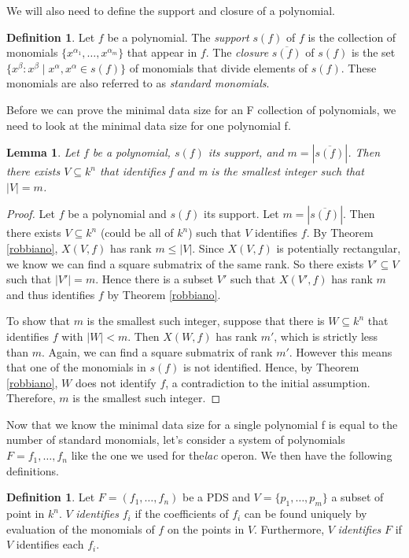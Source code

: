 \documentclass{amsart}
\newtheorem{lem}[thm]{Lemma}
\theoremstyle{definition}
\newtheorem{defn}[thm]{Definition}
\theoremstyle{remark}
\theoremstyle{example}
\theoremstyle{conjecture}
\numberwithin{equation}{section}
\begin{document}
We will also need to define the support and closure of a polynomial.

\begin{defn}
Let $f$ be a polynomial.  The \emph{support} $s(f)$ of $f$ is the
collection of monomials $\{x^{\alpha_1},\ldots,x^{\alpha_m}\}$ that
appear in $f$. The \emph{closure} $\overline{s(f)}$ of $s(f)$ is the
set $\{x^{\beta} : x^\beta \mid x^{\alpha}, x^\alpha \in s(f)\}$ of
monomials that divide elements of $s(f)$. These monomials are also referred to as \emph{standard monomials}.
\end{defn}
Before we can prove the minimal data size for an F collection of polynomials, we need to look at the minimal data size for one polynomial f. 
\begin{lem}
\label{lem1} Let $f$ be a polynomial, $s(f)$ its support, and
$m=|\overline{s(f)}|$.  Then there exists $V\subseteq k^n$ that identifies f and m is the smallest integer such that $|V|=m$.
\end{lem}

\begin{proof}
Let $f$ be a polynomial and $s(f)$ its support.  Let
$m=|\overline{s(f)}|$.  Then there exists $V\subseteq k^n$ (could be all of $k^n$) such that $V$ identifies $f$.  By Theorem
\ref{robbiano}, $X(V,f)$ has rank $m\leq |V|$.  Since $X(V,f)$ is
potentially rectangular, we know we can find a square submatrix of
the same rank.  So there exists $V'\subseteq V$ such that $|V'|=m$.
Hence there is a subset $V'$ such that $X(V',f)$ has rank $m$ and
thus identifies $f$ by Theorem \ref{robbiano}.

To show that $m$ is the smallest such integer, suppose that there is
$W\subseteq k^n$ that identifies $f$ with $|W|<m$.  Then $X(W,f)$
has rank $m'$, which is strictly less than $m$.  Again, we can find
a square submatrix of rank $m'$.  However this means that one of the
monomials in $s(f)$ is not identified.  Hence, by Theorem
\ref{robbiano}, $W$ does not identify $f$, a contradiction
to the initial assumption.  Therefore, $m$ is the smallest such
integer.
\end{proof}

Now that we know the minimal data size for a single polynomial f is equal to the number of standard monomials, let's consider a system of polynomials $F={f_1,\dots,f_n}$ like the one we used for the\textit{lac} operon. We then have the following definitions. 

\begin{defn}
Let $F=(f_1,\ldots,f_n)$ be a PDS and $V=\{p_1,\ldots,p_m\}$ a
subset of point in $k^n$.  $V$ \emph{identifies} $f_i$ if the
coefficients of $f_i$ can be found uniquely by evaluation of the
monomials of $f$ on the points in $V$. Furthermore, $V$
\emph{identifies} $F$ if $V$ identifies each $f_i$.
\end{defn}
\end{document}
